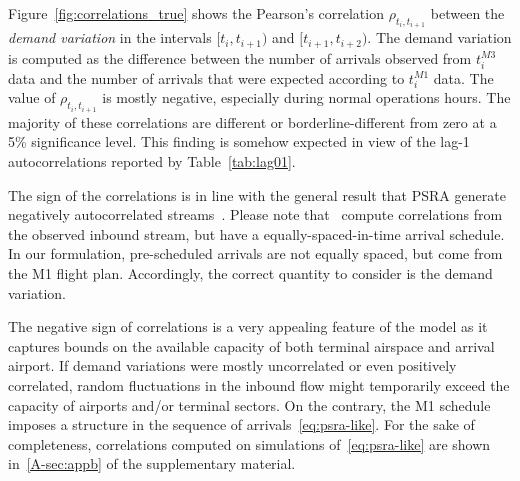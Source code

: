 \documentclass[draft,review]{elsarticle}
\begin{document}
Figure~\ref{fig:correlations_true} shows the Pearson's correlation \(\rho_{t_i, t_{i+1}}\) between the \emph{demand variation} in the intervals \([t_i, t_{i+1})\) and \([t_{i+1}, t_{i+2})\).
The demand variation is computed as the difference between the number of arrivals observed from \(t^{M3}_i\) data and the number of arrivals that were expected according to \(t^{M1}_i\) data.
The value of \(\rho_{t_i, t_{i+1}}\) is mostly negative, especially during normal operations hours.
The majority of these correlations are different or borderline-different from zero at a 5\% significance level.
This finding is somehow expected in view of the lag-1 autocorrelations reported by Table~\ref{tab:lag01}.
\begin{kpt}
	The sign of the correlations is in line with the general result that \ac{PSRA} generate negatively autocorrelated streams~\citep{guadagni2011queueing}.
  Please note that~\citet{guadagni2011queueing} compute correlations from the observed inbound stream, but have a equally-spaced-in-time arrival schedule.  In our formulation, pre-scheduled arrivals are not equally spaced, but come from the M1 flight plan.
  Accordingly, the correct quantity to consider is the demand variation.
\end{kpt}


  The negative sign of correlations is a very appealing feature of the model as it captures bounds on the available capacity of both terminal airspace and arrival airport.
  If demand variations were mostly uncorrelated or even positively correlated, random fluctuations in the inbound flow might temporarily exceed the capacity of airports and/or terminal sectors.
  On the contrary, the M1 schedule imposes a structure in the sequence of arrivals~\eqref{eq:psra-like}.
For the sake of completeness, correlations computed on simulations of~\ref{eq:psra-like} are shown in~\ref{A-sec:appb} of the supplementary material.
\end{document}
